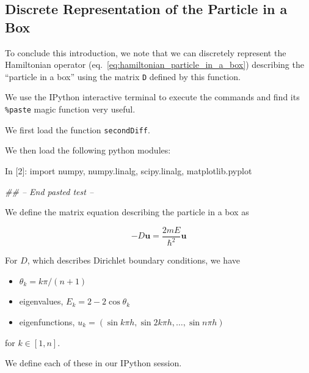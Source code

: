 \documentclass[12pt,]{book}
\newenvironment{Shaded}{}{}
\newcommand{\DecValTok}[1]{\textcolor[rgb]{0.25,0.63,0.44}{{#1}}}
\newcommand{\ImportTok}[1]{{#1}}
\newcommand{\CommentTok}[1]{\textcolor[rgb]{0.38,0.63,0.69}{\textit{{#1}}}}
\newcommand{\NormalTok}[1]{{#1}}
\providecommand{\tightlist}{%
  \setlength{\itemsep}{0pt}\setlength{\parskip}{0pt}}
\begin{document}
\vfill

\pagebreak

\vfill

\pagebreak

\subsection{Discrete Representation of the Particle in a
Box}\label{discrete-representation-of-the-particle-in-a-box}

To conclude this introduction, we note that we can discretely represent
the Hamiltonian operator (eq.~\ref{eq:hamiltonian_particle_in_a_box})
describing the ``particle in a box'' using the matrix \texttt{D} defined
by this function.

We use the IPython interactive terminal to execute the commands and find
its \texttt{\%paste} magic function very useful.

We first load the function \texttt{secondDiff}.

We then load the following python modules:

\begin{Shaded}
\begin{Highlighting}[]
\NormalTok{In [}\DecValTok{2}\NormalTok{]: }\ImportTok{import} \NormalTok{numpy, numpy.linalg, scipy.linalg, matplotlib.pyplot}

\CommentTok{## -- End pasted test --}
\end{Highlighting}
\end{Shaded}

We define the matrix equation describing the particle in a box as

\begin{equation}-D\mathbf{u}=\frac{2mE}{\hbar^2} \mathbf{u}\label{eq:matrix_eqn_particle_in_a_box}\end{equation}

For \(D\), which describes Dirichlet boundary conditions, we have

\begin{itemize}
\tightlist
\item
  \(\theta_k = k\pi/(n+1)\)
\item
  eigenvalues, \(E_k = 2-2\cos\theta_k\)
\item
  eigenfunctions,
  \(u_k = (\sin k\pi h, \sin 2k\pi h, \dots, \sin n\pi h)\)
\end{itemize}

for \(k\in[1,n]\).

We define each of these in our IPython session.
\end{document}
